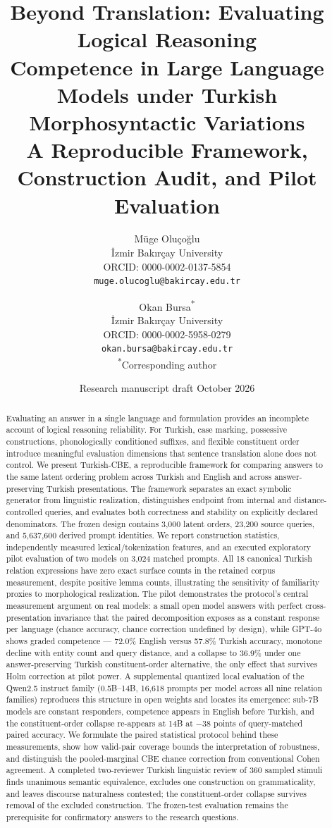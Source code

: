 \documentclass[11pt]{article}
\title{\textbf{Beyond Translation: Evaluating Logical Reasoning\\
Competence in Large Language Models under Turkish\\
Morphosyntactic Variations}\\[1.2ex]
\large A Reproducible Framework, Construction Audit, and Pilot Evaluation}
\author{Müge Oluçoğlu\\
\small İzmir Bakırçay University\\
\small ORCID: 0000-0002-0137-5854\\
\small \texttt{muge.olucoglu@bakircay.edu.tr}
\and
Okan Bursa\textsuperscript{*}\\
\small İzmir Bakırçay University\\
\small ORCID: 0000-0002-5958-0279\\
\small \texttt{okan.bursa@bakircay.edu.tr}\\
\small \textsuperscript{*}Corresponding author}
\date{\small Research manuscript draft \; \textbullet \; 27 October 2026}
\begin{document}
\maketitle
\thispagestyle{empty}

\begin{abstract}
\noindent
Evaluating an answer in a single language and formulation provides an incomplete account of
logical reasoning reliability. For Turkish, case marking, possessive constructions, phonologically
conditioned suffixes, and flexible constituent order introduce meaningful evaluation dimensions that
sentence translation alone does not control. We present Turkish-CBE, a reproducible framework for
comparing answers to the same latent ordering problem across Turkish and English and across
answer-preserving Turkish presentations. The framework separates an exact symbolic generator from
linguistic realization, distinguishes endpoint from internal and distance-controlled queries, and
evaluates both correctness and stability on explicitly declared denominators. The frozen design
contains 3,000 latent orders, 23,200 source queries, and 5,637,600 derived prompt identities. We
report construction statistics, independently measured lexical/tokenization features, and an
executed exploratory pilot evaluation of two models on 3,024 matched prompts. All 18 canonical
Turkish relation expressions have zero exact surface counts in the retained corpus measurement,
despite positive lemma counts, illustrating the sensitivity of familiarity proxies to morphological
realization. The pilot demonstrates the protocol's central measurement argument on real models: a
small open model answers with perfect cross-presentation invariance that the paired decomposition
exposes as a constant response per language (chance accuracy, chance correction undefined by
design), while GPT-4o shows graded competence --- 72.0\% English versus 57.8\% Turkish accuracy,
monotone decline with entity count and query distance, and a collapse to 36.9\% under one
answer-preserving Turkish constituent-order alternative, the only effect that survives Holm
correction at pilot power. A supplemental quantized local evaluation of the Qwen2.5 instruct family
(0.5B--14B, 16,618 prompts per model across all nine relation families) reproduces this structure in
open weights and locates its emergence: sub-7B models are constant responders, competence appears in
English before Turkish, and the constituent-order collapse re-appears at 14B at $-38$ points of
query-matched paired accuracy. We formulate the paired statistical protocol behind these measurements,
show how valid-pair coverage bounds the interpretation of robustness, and distinguish the
pooled-marginal CBE chance correction from conventional Cohen agreement. A completed two-reviewer
Turkish linguistic review of 360 sampled stimuli finds unanimous semantic equivalence, excludes one
construction on grammaticality, and leaves discourse naturalness contested; the constituent-order
collapse survives removal of the excluded construction. The frozen-test evaluation remains the
prerequisite for confirmatory answers to the research questions.
\end{abstract}
\end{document}
